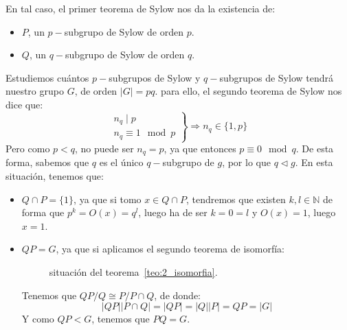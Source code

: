 \noindent
En tal caso, el primer teorema de Sylow nos da la existencia de:
\begin{itemize}
    \item $P$, un $p-$subgrupo de Sylow de orden $p$.
    \item $Q$, un $q-$subgrupo de Sylow de orden $q$.
\end{itemize}
Estudiemos cuántos $p-$subgrupos de Sylow y $q-$subgrupos de Sylow tendrá nuestro grupo $G$, de orden $|G| = pq$. para ello, el segundo teorema de Sylow nos dice que:
\begin{equation*}
    \left.\begin{array}{r}
            n_q \mid p \\
            n_q\equiv 1 \mod p
    \end{array}\right\} \Longrightarrow n_q \in \{1,p\}
\end{equation*}
Pero como $p<q$, no puede ser $n_q = p$, ya que entonces $p\equiv 0 \mod q$. De esta forma, sabemos que $q$ es el único $q-$subgrupo de $g$, por lo que $q\lhd g$. En esta situación, tenemos que:
\begin{itemize}
    \item $Q\cap P = \{1\}$, ya que si tomo $x\in Q\cap P$, tendremos que existen $k,l\in \mathbb{N}$ de forma que $p^k = O(x) = q^l$, luego ha de ser $k = 0 = l$ y $O(x) = 1$, luego $x = 1$.
    \item $QP = G$, ya que si aplicamos el segundo teorema de isomorfía:
        \begin{figure}[h]
            \centering
            \caption{situación del teorema~\ref{teo:2_isomorfia}.}
            \label{fig:2_isomorfia}
        \end{figure}
        Tenemos que $QP/Q \cong P/P\cap Q$, de donde:
        \begin{equation*}
            |QP||P\cap Q| = |QP| = |Q||P| = QP = |G|
        \end{equation*}
        Y como $QP < G$, tenemos que $PQ = G$.
\end{itemize}
